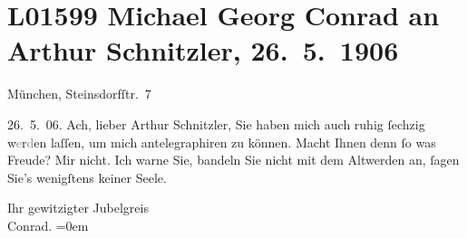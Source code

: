 

\section[Michael Georg Conrad an Arthur Schnitzler, 26. 5. 1906]{L01599 Michael Georg Conrad an Arthur Schnitzler, 26. 5. 1906}
\nopagebreak{}
\rehead{ }\normalsize\beginnumbering{}
\toendnotes[C]{\smallbreak\pagebreak[2]}
\pstart
           {\pb}München, Steinsdorfſtr. 7\pend
           
\pstart
           \raggedleft{}26. 5. 06.\pend
           \vspace{0.5em}
\pstart
           Ach, lieber Arthur Schnitzler, Sie haben mich auch ruhig ſechzig
               w\textcolor{gray}{e}r\textcolor{gray}{d}en laſſen, um mich antelegraphiren zu können. Macht Ihnen denn ſo was Freude? Mir
               nicht. Ich warne Sie, bandeln Sie nicht mit dem Altwerden an, ſagen Sie’s wenigſtens
               keiner Seele.\pend
           
\pstart
           Ihr gewitzigter Jubelgreis{\\[\baselineskip]}\spacefill\mbox{Conrad.}\pend
           \leftskip=0em{}\endnumbering{}  
      